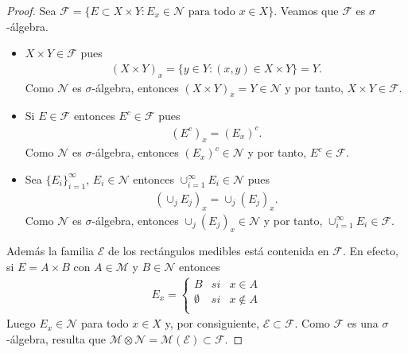 \begin{proof}
Sea $\mathcal{F} = \{ E \subset X \times Y : E_x \in \mathcal{N} \text{ para todo } x \in X \}$. Veamos que $\mathcal{F}$ es $\sigma$-álgebra.
\begin{itemize}
    \item $X \times Y \in \mathcal{F}$ pues
    \begin{align*}
        (X \times Y)_x = \{ y \in Y : (x,y) \in X \times Y \} = Y.
    \end{align*}
    Como $\mathcal{N}$ es $\sigma$-álgebra, entonces $(X \times Y)_x = Y \in \mathcal{N}$ y por tanto, $X \times Y \in \mathcal{F}$.
    \item Si $E \in \mathcal{F}$ entonces $E^c \in \mathcal{F}$ pues
    \begin{align*}
        (E^c)_x = (E_x)^c.
    \end{align*}
    Como $\mathcal{N}$ es $\sigma$-álgebra, entonces $(E_x)^c \in \mathcal{N}$ y por tanto, $E^c \in \mathcal{F}$.
    \item Sea $\{E_i\}_{i=1}^{\infty}$, $E_i \in \mathcal{N}$ entonces $\cup_{i=1}^{\infty}{E_i} \in \mathcal{N}$ pues
    \begin{align*}
         (\cup_j E_j)_x = \cup_j (E_j)_x.
    \end{align*}
    Como $\mathcal{N}$ es $\sigma$-álgebra, entonces $\cup_j (E_j)_x \in \mathcal{N}$ y por tanto, $\cup_{i=1}^{\infty}{E_i} \in \mathcal{F}$.
\end{itemize}
Además la familia $\mathcal{E}$ de los rectángulos medibles está contenida en $\mathcal{F}$. En efecto, si $E = A \times B$ con $A \in \mathcal{M}$ y $B \in \mathcal{N}$ entonces
\begin{align*}
    E_x = \left\{ \begin{array}{lcc}
             B &  si  & x \in A\\
            \emptyset &  si  &  x \not \in A\\
             \end{array}
        \right. 
\end{align*}
Luego $E_x \in \mathcal{N}$ para todo $x \in X$ y, por consiguiente, $\mathcal{E} \subset \mathcal{F}$. Como $\mathcal{F}$ es una $\sigma$-álgebra, resulta que $\mathcal{M} \otimes \mathcal{N} = \mathcal{M}(\mathcal{E}) \subset \mathcal{F}$.
\end{proof}

